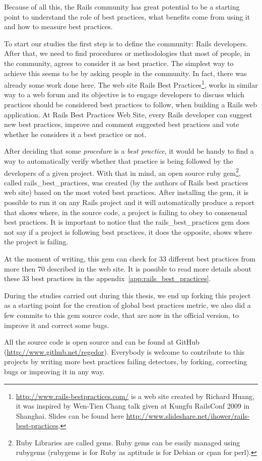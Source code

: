 Because of all this, the Rails community has great potential to be a starting point to understand the role of best practices, 
what benefits come from using it and how to measure best practices.

To start our studies the first step is to define the community: Rails developers. 
After that, we need to find procedures or methodologies that most of people, in the community, agrees to consider it as best practice.
The simplest way to achieve this seems to be by asking people in the community. 
In fact, there was already some work done here.
The web site
\textsf{Rails Best Practices}\footnote{\url{http://www.rails-bestpractices.com/} is a web site created by Richard Huang,
it was inspired by Wen-Tien Chang talk given at Kungfu RailsConf 2009 in Shanghai. Slides can be found here
\url{http://www.slideshare.net/ihower/rails-best-practices}.},
works in similar way to a web forum and its objective is to engage developers to discuss which practices
should be considered best practices to follow, when building a Rails web application.
At Rails Best Practices Web Site, every Rails developer can suggest new best practices,
improve and comment suggested best practices and vote whether he considers it a best practice or not.

After deciding that some \emph{procedure} is a \emph{best practice},
it would be handy to find a way to automatically verify whether 
that practice is being followed by the developers of a given project.
With that in mind, an open source ruby 
\textsf{gem}\footnote{
  Ruby Libraries are called gems. Ruby gems can be easily managed using rubygems 
  (rubygems is for Ruby as aptitude is for Debian or cpan for perl).
}, 
called rails\_best\_practices, was created (by the authors of Rails best practices web site) 
based on the most voted best practices. 
After installing the gem, it is possible to run it on any Rails project
and it will automatically produce a report that shows where,
in the source code, a project is failing to obey to consensual best practices.
It is important to notice that the rails\_best\_practices gem does not say if a project is following best practices,
it does the opposite, shows where the project is failing.

At the moment of writing, this gem can check for 33 different best practices from more then 70 described in the web site.
It is possible to read more details about these 33 best practices in the appendix~\ref{app:rails_best_practices}.

During the studies carried out during this thesis, 
we end up forking this project as a starting point for the creation of global best practices metric,
we also did a few commits to this gem source code, that are now in the official version, to improve it and correct some bugs. 

All the source code is open source and can be found at GitHub (\url{http://www.github.net/regedor}).
Everybody is welcome to contribute to this projects by writing more best practices failing detectors,
by forking, correcting bugs or improving it in any way.




